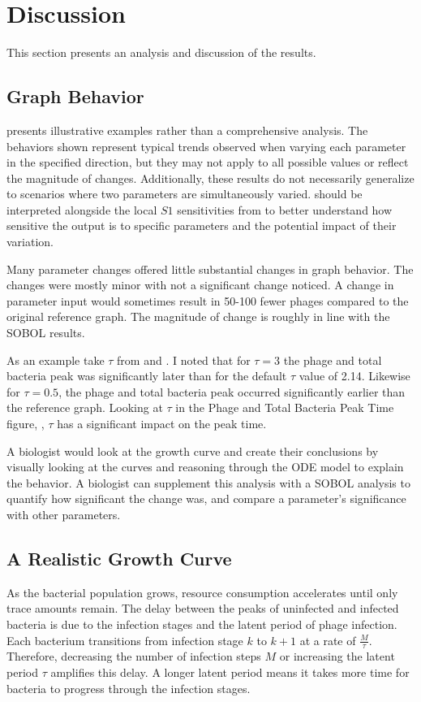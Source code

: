 \chapter{Discussion}
\label{Discussion}
This section presents an analysis and discussion of the results. 

\section{Graph Behavior}
 presents illustrative examples rather than a comprehensive analysis. 
The behaviors shown represent typical trends observed when varying each parameter in the specified direction, but they may not apply to all possible values or reflect the magnitude of changes. 
Additionally, these results do not necessarily generalize to scenarios where two parameters are simultaneously varied. 
 should be interpreted alongside the local $S1$ sensitivities from  to better understand how sensitive the output is to specific parameters and the potential impact of their variation.

Many parameter changes offered little substantial changes in graph behavior. 
The changes were mostly minor with not a significant change noticed. 
A change in parameter input would sometimes result in 50-100 fewer phages compared to the original reference graph. 
The magnitude of change is roughly in line with the SOBOL results. 

As an example take $\tau$ from  and . 
I noted that for $\tau=3$ the phage and total bacteria peak was significantly later than for the default $\tau$ value of 2.14. 
Likewise for $\tau=0.5$, the phage and total bacteria peak occurred significantly earlier than the reference graph. 
Looking at $\tau$ in the Phage and Total Bacteria Peak Time figure, , $\tau$ has a significant impact on the peak time. 

A biologist would look at the growth curve and create their conclusions by visually looking at the curves and reasoning through the ODE model to explain the behavior. 
A biologist can supplement this analysis with a SOBOL analysis to quantify how significant the change was, and compare a parameter's significance with other parameters. 

\section{A Realistic Growth Curve}
As the bacterial population grows, resource consumption accelerates until only trace amounts remain. 
The delay between the peaks of uninfected and infected bacteria is due to the infection stages and the latent period of phage infection. 
Each bacterium transitions from infection stage $k$ to $k+1$ at a rate of $\frac{M}{\tau}$. 
Therefore, decreasing the number of infection steps $M$ or increasing the latent period $\tau$ amplifies this delay. 
A longer latent period means it takes more time for bacteria to progress through the infection stages.

